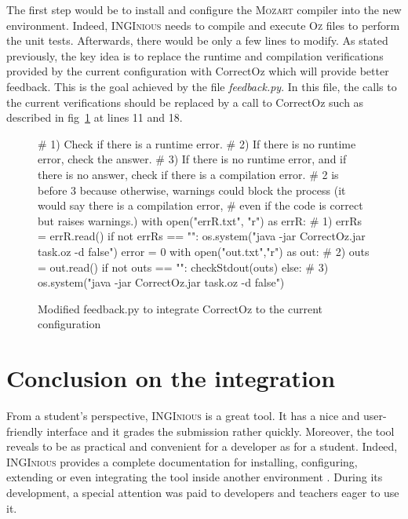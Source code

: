\documentclass[11pt,a4paper,twoside,openright]{report}
\begin{document}
The first step would be to install and configure the \textsc{Mozart} compiler into 
the new environment. Indeed, \textsc{INGInious} needs to compile and 
execute \textsc{Oz} files to perform the unit tests. Afterwards, there would be only 
a few lines to modify. As stated previously, the key idea is to replace the 
runtime and compilation verifications provided by the current configuration 
with CorrectOz which will provide better feedback. This is the goal 
achieved by the file \textit{feedback.py}. In this file, the calls to the 
current verifications should be replaced by a call to CorrectOz such as 
described in fig~\ref{fig:new_call} at lines 11 and 18.
\newpage
\begin{figure}[!ht]
 \begin{PYTHON}
# 1) Check if there is a runtime error.
# 2) If there is no runtime error, check the answer.
# 3) If there is no runtime error, and if there is no answer, check if there is a compilation error.
# 2 is before 3 because otherwise, warnings could block the process (it would say there is a compilation error, 
# even if the code is correct but raises warnings.)
with open("errR.txt", "r") as errR: # 1)
    errRs = errR.read()
    if not errRs == "":
         os.system("java -jar CorrectOz.jar task.oz -d false")
    error = 0
    with open("out.txt","r") as out: # 2)
        outs = out.read()
        if not outs == "":
            checkStdout(outs)
        else: # 3)
            os.system("java -jar CorrectOz.jar task.oz -d false")
\end{PYTHON}
\caption{Modified feedback.py to integrate CorrectOz to the current 
configuration}
\label{fig:new_call}
\end{figure}

\section{Conclusion on the integration}

From a student's perspective, \textsc{INGInious} is a great tool. It has a 
nice and user-friendly interface and it grades the submission rather quickly. 
Moreover, the tool reveals to be as practical and convenient for a developer as 
for a student. Indeed, \textsc{INGInious} provides a complete documentation for 
installing, configuring, extending or even integrating the tool inside another 
environment \cite{inginious_doc}. During its development, a special attention was paid to developers 
and teachers eager to use it.\\
\end{document}
